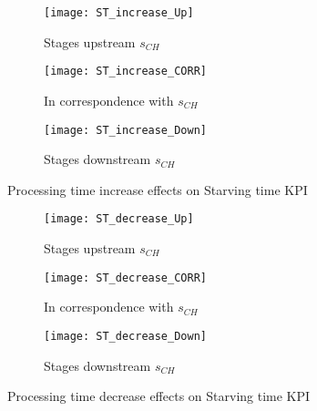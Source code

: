 \begin{landscape}
\begin{figure}[p]
  \centering
  \begin{subfigure}[t]{0.4\textwidth}
    \texttt{[image: ST\_increase\_Up]}
    \caption{Stages upstream $s_{CH}$}
    \label{fig:Processing time increase effects on Starving time KPI - Stages upstream}   
  \end{subfigure}
  \begin{subfigure}[t]{0.4\textwidth}
    \texttt{[image: ST\_increase\_CORR]}
    \caption{In correspondence with $s_{CH}$}
    \label{fig:Processing time increase effects on Starving time KPI - In correspondence with}   
  \end{subfigure}
  \begin{subfigure}[t]{0.4\textwidth}
    \texttt{[image: ST\_increase\_Down]}
    \caption{Stages downstream $s_{CH}$}
    \label{fig:Processing time increase effects on Starving time KPI - Stages downstream}   
  \end{subfigure}
  \caption{Processing time increase effects on Starving time KPI}
  \label{fig:Processing time increase effects on Starving time KPI}
\end{figure}
\begin{figure}[p]
  \centering
  \begin{subfigure}[b]{0.4\textwidth}
    \texttt{[image: ST\_decrease\_Up]}
    \caption{Stages upstream $s_{CH}$}
    \label{fig:Processing time decrease effects on Starving time KPI - Stages upstream}   
  \end{subfigure}
  \begin{subfigure}[b]{0.4\textwidth}
    \texttt{[image: ST\_decrease\_CORR]}
    \caption{In correspondence with $s_{CH}$}
    \label{fig:Processing time decrease effects on Starving time KPI - In correspondence with}   
  \end{subfigure}
  \begin{subfigure}[b]{0.4\textwidth}
    \texttt{[image: ST\_decrease\_Down]}
    \caption{Stages downstream $s_{CH}$}
    \label{fig:Processing time decrease effects on Starving time KPI - Stages downstream}   
  \end{subfigure}
  \caption{Processing time decrease effects on Starving time KPI}
  \label{fig:Processing time decrease effects on Starving time KPI}
\end{figure}
\end{landscape}
